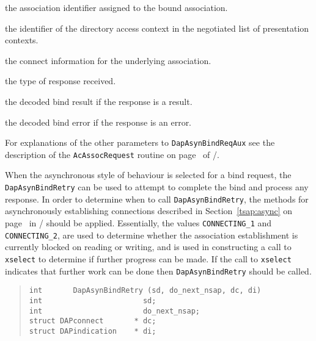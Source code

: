 \begin{describe}

\item [\verb"dc\_sd":]
the association identifier assigned to the bound association.

\item [\verb"dc\_pctx\_id":]
the identifier of the directory access context in the negotiated list of
presentation contexts.

\item [\verb"dc\_connect":]
the connect information for the underlying association.

\item [\verb"dc\_result":]
the type of response received.

\item [\verb"dc\_bind\_res":]
the decoded bind result if the response is a result.

\item [\verb"dc\_bind\_err":]
the decoded bind error if the response is an error.
\end{describe}

For explanations of the other parameters to \verb"DapAsynBindReqAux"
see the description of the \verb"AcAssocRequest" routine on
page~\pageref{AcAssocRequest} of \volone/.

When the asynchronous style of behaviour is selected for a bind request,
the \verb"DapAsynBindRetry" can be used to attempt to complete the
bind and process any response.
In order to determine when to call \verb"DapAsynBindRetry", the
methods for asynchronously establishing connections described in
Section~\ref{tsap:async} on page~\pageref{tsap:async} in \voltwo/
should be applied.
Essentially, the values \verb"CONNECTING_1" and \verb"CONNECTING_2",
are used to determine whether the association establishment is
currently blocked on reading or writing, and is used in constructing
a call to \verb"xselect" to determine if further progress can be
made. If the call to \verb"xselect" indicates that further work
can be done then \verb"DapAsynBindRetry" should be called.

\begin{quote}\small\begin{verbatim}
int       DapAsynBindRetry (sd, do_next_nsap, dc, di)
int                       sd;
int                       do_next_nsap;
struct DAPconnect       * dc;
struct DAPindication    * di;
\end{verbatim}\end{quote}

